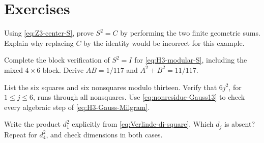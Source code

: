 \section{Exercises}

\begin{exercise}\label{ex:Z3-S-square}
Using \eqref{eq:Z3-center-S}, prove $S^2=C$ by performing the
two finite geometric sums.  Explain why replacing $C$ by the
identity would be incorrect for this example.

\par\smallskip{}\par
\end{exercise}

\begin{exercise}\label{ex:H3-S-square}
Complete the block verification of $S^2=I$ for
\eqref{eq:H3-modular-S}, including the mixed $4\times6$ block.
Derive $AB=1/117$ and $A^2+B^2=11/117$.

\par\smallskip{}\par
\end{exercise}

\begin{exercise}\label{ex:Gauss13}
List the six squares and six nonsquares modulo thirteen.  Verify
that $6j^2$, for $1\leq j\leq6$, runs through all nonsquares.
Use \eqref{eq:nonresidue-Gauss13} to check every algebraic step
of \eqref{eq:H3-Gauss-Milgram}.

\par\smallskip{}\par
\end{exercise}

\begin{exercise}\label{ex:Verlinde-d1}
Write the product $d_1^2$ explicitly from
\eqref{eq:Verlinde-di-square}.  Which $d_j$ is absent?  Repeat
for $d_4^2$, and check dimensions in both cases.

\par\smallskip{}\par
\end{exercise}

